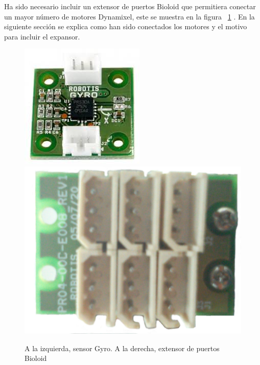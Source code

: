 Ha sido necesario incluir un extensor de puertos Bioloid que permitiera conectar un mayor n\'umero de motores Dynamixel, este se muestra en la figura ~\ref{fig:gyroYextensor} \cite{hub}. En la siguiente secci\'on se explica como han sido conectados los motores y el motivo para incluir el expansor. 
\begin{figure}[hbtp]
\centering
\includegraphics[scale=0.35]{imagenes/gyro.jpg}
\includegraphics[scale=0.08]{imagenes/extensor.jpg}
\caption{A la izquierda, sensor Gyro. A la derecha, extensor de puertos Bioloid}
\label{fig:gyroYextensor}
\end{figure}

